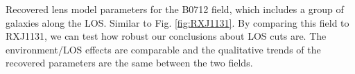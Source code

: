 \label{fig:B0712} Recovered lens model parameters for the B0712 field, which includes a group of galaxies along the LOS. Similar to Fig. \ref{fig:RXJ1131}. By comparing this field to RXJ1131, we can test how robust our conclusions about LOS cuts are. The environment/LOS effects are comparable and the qualitative trends of the recovered parameters are the same between the two fields.
  
